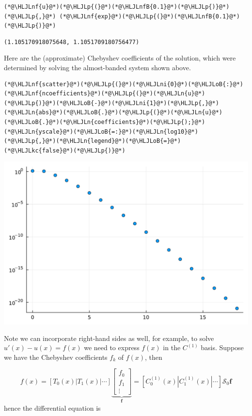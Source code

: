 \documentclass[12pt,a4paper]{article}
\newcommand{\HLJLkc}[1]{\textcolor[RGB]{59,151,46}{\textit{#1}}}
\newcommand{\HLJLn}[1]{#1}
\newcommand{\HLJLnf}[1]{\textcolor[RGB]{66,102,213}{#1}}
\newcommand{\HLJLnfB}[1]{\textcolor[RGB]{59,151,46}{#1}}
\newcommand{\HLJLni}[1]{\textcolor[RGB]{59,151,46}{#1}}
\newcommand{\HLJLoB}[1]{\textcolor[RGB]{102,102,102}{\textbf{#1}}}
\newcommand{\HLJLp}[1]{#1}
\begin{document}
\begin{lstlisting}
(*@\HLJLnf{u}@*)(*@\HLJLp{(}@*)(*@\HLJLnfB{0.1}@*)(*@\HLJLp{)}@*) (*@\HLJLp{,}@*) (*@\HLJLnf{exp}@*)(*@\HLJLp{(}@*)(*@\HLJLnfB{0.1}@*)(*@\HLJLp{)}@*)
\end{lstlisting}

\begin{lstlisting}
(1.105170918075648, 1.1051709180756477)
\end{lstlisting}


Here are the (approximate) Chebyshev coefficients of the solution, which were determined by solving the almost-banded system shown above.


\begin{lstlisting}
(*@\HLJLnf{scatter}@*)(*@\HLJLp{(}@*)(*@\HLJLni{0}@*)(*@\HLJLoB{:}@*)(*@\HLJLnf{ncoefficients}@*)(*@\HLJLp{(}@*)(*@\HLJLn{u}@*)(*@\HLJLp{)}@*)(*@\HLJLoB{-}@*)(*@\HLJLni{1}@*)(*@\HLJLp{,}@*)(*@\HLJLn{abs}@*)(*@\HLJLoB{.}@*)(*@\HLJLp{(}@*)(*@\HLJLn{u}@*)(*@\HLJLoB{.}@*)(*@\HLJLn{coefficients}@*)(*@\HLJLp{);}@*)(*@\HLJLn{yscale}@*)(*@\HLJLoB{=:}@*)(*@\HLJLn{log10}@*)(*@\HLJLp{,}@*)(*@\HLJLn{legend}@*)(*@\HLJLoB{=}@*)(*@\HLJLkc{false}@*)(*@\HLJLp{)}@*)
\end{lstlisting}

\includegraphics[width=\linewidth]{jl_GsbqQZ/Chapter4_27_1.pdf}

Note we can incorporate right-hand sides as well, for example, to solve $u'(x) - u(x) = f(x)$ we need to express $f(x)$ in the $C^{(1)}$ basis.  Suppose we have the Chebyshev coefficients $f_k$ of $f(x)$, then

\[
f(x) = \left[ T_0(x) | T_1(x) | \cdots \right]\underbrace{\begin{bmatrix} f_0 \\
f_1 \\
 \vdots \end{bmatrix}}_{\mathbf{f}} =  \left[ C_0^{(1)}(x) | C_1^{(1)}(x) | \cdots \right]\mathcal{S}_0 \mathbf{f} 
\]
hence the differential equation is
\end{document}
